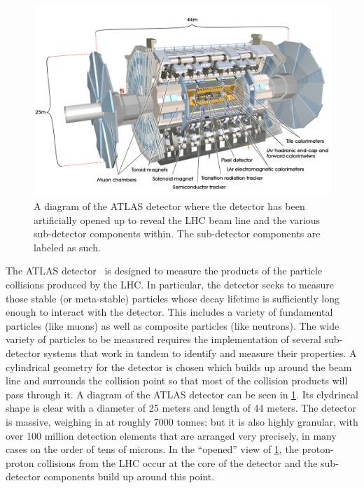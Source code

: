 

\begin{figure}[ht!]
\centering
\includegraphics[width=.9\textwidth]{figures/atlas/detector.jpg}
\caption{A diagram of the ATLAS detector where the detector has
been artificially opened up to reveal the LHC beam line and the
various sub-detector components within. The sub-detector components
are labeled as such.}
\label{fig:atlas}
\end{figure}

The ATLAS detector~\cite{ATLAS} is designed to measure
the products of the particle collisions produced by the LHC.
In particular, the detector seeks to measure those stable 
(or meta-stable) particles whose decay lifetime is sufficiently
long enough to interact with the detector.  This includes
a variety of fundamental particles (like muons) as well as 
composite particles (like neutrons). The wide variety of 
particles to be measured requires the implementation
of several sub-detector systems that work in tandem 
to identify and measure their properties. 
A cylindrical geometry for the detector is chosen
which builds up around the beam line and surrounds
the collision point so that most of the collision
products will pass through it.
A diagram of the ATLAS detector can be seen in \fig\ref{fig:atlas}.
Its clydrincal shape is clear with a diameter of 25 meters
and length of 44 meters. The detector is massive, weighing
in at roughly 7000 tonnes; but it is also highly granular, with
over 100 million detection elements that are arranged very precisely, 
in many cases on the order of tens of microns.
In the ``opened'' view of \fig\ref{fig:atlas}, the proton-proton
collisions from the LHC occur at the core of the detector
and the sub-detector components build up around this point.

